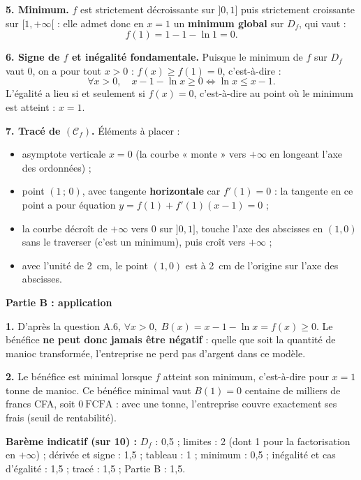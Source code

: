 \documentclass[11pt]{article}
\begin{document}
\begin{corrige}
\textbf{5. Minimum.} $f$ est strictement décroissante sur $]0,1]$ puis strictement croissante sur $[1,+\infty[$ : elle admet donc en $x=1$ un \textbf{minimum global} sur $D_f$, qui vaut :
\[ f(1) = 1 - 1 - \ln 1 = 0. \]

\textbf{6. Signe de $f$ et inégalité fondamentale.} Puisque le minimum de $f$ sur $D_f$ vaut $0$, on a pour tout $x>0$ : $f(x) \geq f(1) = 0$, c'est-à-dire :
\[ \forall x>0,\quad x-1-\ln x \geq 0 \iff \boxed{\ln x \leq x-1}. \]
L'égalité a lieu si et seulement si $f(x)=0$, c'est-à-dire au point où le minimum est atteint : $\boxed{x=1}$.

\textbf{7. Tracé de $(\mathcal{C}_f)$.} Éléments à placer :
\begin{itemize}
\item asymptote verticale $x=0$ (la courbe « monte » vers $+\infty$ en longeant l'axe des ordonnées) ;
\item point $(1\,;\,0)$, avec tangente \textbf{horizontale} car $f'(1)=0$ : la tangente en ce point a pour équation $y = f(1) + f'(1)(x-1) = 0$ ;
\item la courbe décroît de $+\infty$ vers $0$ sur $]0,1]$, touche l'axe des abscisses en $(1,0)$ sans le traverser (c'est un minimum), puis croît vers $+\infty$ ;
\item avec l'unité de \SI{2}{cm}, le point $(1,0)$ est à \SI{2}{cm} de l'origine sur l'axe des abscisses.
\end{itemize}

\textbf{Partie B : application}

\textbf{1.} D'après la question A.6, $\forall x>0,\; B(x) = x-1-\ln x = f(x) \geq 0$. Le bénéfice \textbf{ne peut donc jamais être négatif} : quelle que soit la quantité de manioc transformée, l'entreprise ne perd pas d'argent dans ce modèle.

\textbf{2.} Le bénéfice est minimal lorsque $f$ atteint son minimum, c'est-à-dire pour $x = 1$ tonne de manioc. Ce bénéfice minimal vaut $B(1) = 0$ centaine de milliers de francs CFA, soit $\boxed{0\ \text{FCFA}}$ : avec une tonne, l'entreprise couvre exactement ses frais (seuil de rentabilité).

\textbf{Barème indicatif (sur 10) :} $D_f$ : 0,5 ; limites : 2 (dont 1 pour la factorisation en $+\infty$) ; dérivée et signe : 1,5 ; tableau : 1 ; minimum : 0,5 ; inégalité et cas d'égalité : 1,5 ; tracé : 1,5 ; Partie B : 1,5.


\end{corrige}
\end{document}
